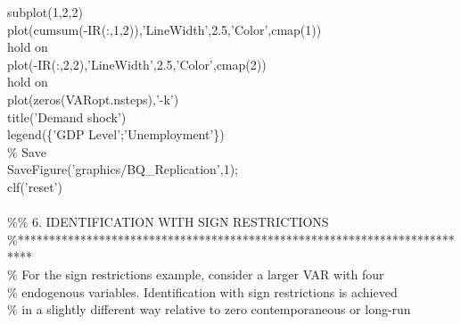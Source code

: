\hspace{1mm}subplot(1,2,2) \\ 
\hspace{1mm}plot(cumsum(-IR(:,1,2)),\textcolor{matlabpurple}{'LineWidth'},2.5,\textcolor{matlabpurple}{'Color'},cmap(1)) \\ 
\hspace{1mm}hold on \\ 
\hspace{1mm}plot(-IR(:,2,2),\textcolor{matlabpurple}{'LineWidth'},2.5,\textcolor{matlabpurple}{'Color'},cmap(2)) \\ 
\hspace{1mm}hold on \\ 
\hspace{1mm}plot(zeros(VARopt.nsteps),\textcolor{matlabpurple}{'-k'}) \\ 
\hspace{1mm}title(\textcolor{matlabpurple}{'Demand shock'}) \\ 
\hspace{1mm}legend(\{\textcolor{matlabpurple}{'GDP Level'};'Unemployment'\}) \\ 
\hspace{1mm}\textcolor{matlabgreen}{\% Save }\\ 
\hspace{1mm}SaveFigure(\textcolor{matlabpurple}{'graphics/BQ\_Replication'},1); \\ 
\hspace{1mm}clf(\textcolor{matlabpurple}{'reset'}) \\ 
\hspace{1mm} \\ 
\hspace{1mm}\textcolor{matlabgreen}{\%}\textcolor{matlabgreen}{\% 6. IDENTIFICATION WITH SIGN RESTRICTIONS }\\ 
\hspace{1mm}\textcolor{matlabgreen}{\%**************************************************************************  }\\ 
\hspace{1mm}\textcolor{matlabgreen}{\% For the sign restrictions example, consider a larger VAR  with four  }\\ 
\hspace{1mm}\textcolor{matlabgreen}{\% endogenous variables. Identification with sign restrictions is achieved  }\\ 
\hspace{1mm}\textcolor{matlabgreen}{\% in a slightly different way relative to zero contemporaneous or long-run  }\\ 
